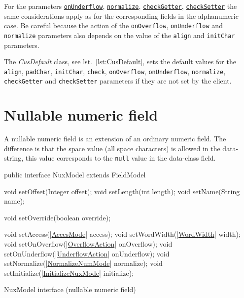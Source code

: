 \documentclass[a4paper,10pt]{report}
\newenvironment{elisting}[1][H]
  {\captionsetup{aboveskip=0pt}\begin{listing}[#1]}
  {\end{listing}%
}
\begin{document}
For the parameters 
\hyperlink{abc:unf}{\texttt{onUnderflow}}, 
\hyperlink{abc:nrm}{\texttt{normalize}},
\hyperlink{abc:get}{\texttt{checkGetter}},
\hyperlink{abc:get}{\texttt{checkSetter}}
the same considerations apply as for the corresponding fields in the 
alphanumeric case. Be careful because the action of the \verb!onOverflow!, 
\verb!onUnderflow! and \verb!normalize! parameters also depends on the value of 
the \verb!align! and \verb!initChar! parameters.

The \textsl{CusDefault} class, see lst.~\ref{lst:CusDefault}, sets the default 
values for the \verb!align!, \verb!padChar!, \verb!initChar!, 
\verb!check!, \texttt{onOver\-flow}, \verb!onUnderflow!, \verb!normalize!, 
\verb!checkGetter! and \verb!checkSetter! parameters if they are not set by the 
client.

\section{Nullable numeric field}
A nullable numeric field is an extension of an ordinary numeric field. 
The difference is that the space value (all space characters) is allowed in the 
data-string, this value corresponds to the \verb!null! value in the data-class 
field.

\begin{elisting}[!htb]
\begin{javacode}
public interface NuxModel extends FieldModel {
    void setOffset(Integer offset);
    void setLength(int length);
    void setName(String name);

    void setOverride(boolean override);

    void setAccess(|\hyperref[lst:AccesMode]{AccesMode}| access);
    void setWordWidth(|\hyperref[lst:WordWidth]{WordWidth}| width);
    void setOnOverflow(|\hyperref[lst:OverflowAction]{OverflowAction}| onOverflow);
    void setOnUnderflow(|\hyperref[lst:UnderflowAction]{UnderflowAction}| onUnderflow);
    void setNormalize(|\hyperref[lst:NormalizeNumMode]{NormalizeNumMode}| normalize);
    void setInitialize(|\hyperref[lst:InitializeNuxMode]{InitializeNuxMode}| initialize);
}
\end{javacode}
\caption{NuxModel interface (nullable numeric field)}
\label{lst:NuxModel}
\end{elisting}
\end{document}
